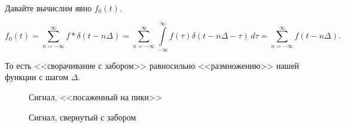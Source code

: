 \documentclass[main.tex]{subfiles}
\begin{document}
Давайте вычислим явно $f_0(t)$.

\[
    f_0(t) = \sum\limits_{n=-\infty}^{\infty} f * \delta(t - n\Delta) =
    \sum\limits_{n=-\infty}^{\infty} \int\limits_{-\infty}^{\infty} 
        f(\tau) \delta(t - n\Delta - \tau)\,d\tau =
    \sum\limits_{n=-\infty}^{\infty} f(t - n\Delta)
.\]

То есть <<сворачивание с забором>> равносильно <<размножению>> нашей функции
с шагом $\Delta$.

\begin{figure}[ht]
    \begin{minipage}{0.49\textwidth}
    \centering
    \caption{Сигнал, <<посаженный на пики>>}
    \label{fig:sit-on-fence}
    \end{minipage}
    \begin{minipage}{0.49\textwidth}
    \centering
    \caption{Сигнал, свернутый с забором}
    \label{fig:convol-with-fence}
    \end{minipage} 
\end{figure}
\end{document}
